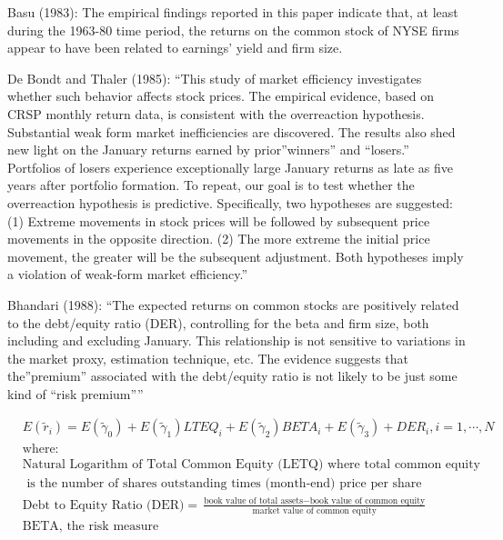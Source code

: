 \documentclass[
  letterpaper,
  DIV=11,
  numbers=noendperiod]{scrreprt}
\begin{document}
Basu (1983): The empirical findings reported in this paper indicate
that, at least during the 1963-80 time period, the returns on the common
stock of NYSE firms appear to have been related to earnings' yield and
firm size.

De Bondt and Thaler (1985): ``This study of market efficiency
investigates whether such behavior affects stock prices. The empirical
evidence, based on CRSP monthly return data, is consistent with the
overreaction hypothesis. Substantial weak form market inefficiencies are
discovered. The results also shed new light on the January returns
earned by prior''winners'' and ``losers.'' Portfolios of losers
experience exceptionally large January returns as late as five years
after portfolio formation. To repeat, our goal is to test whether the
overreaction hypothesis is predictive. Specifically, two hypotheses are
suggested: (1) Extreme movements in stock prices will be followed by
subsequent price movements in the opposite direction. (2) The more
extreme the initial price movement, the greater will be the subsequent
adjustment. Both hypotheses imply a violation of weak-form market
efficiency.''

Bhandari (1988): ``The expected returns on common stocks are positively
related to the debt/equity ratio (DER), controlling for the beta and
firm size, both including and excluding January. This relationship is
not sensitive to variations in the market proxy, estimation technique,
etc. The evidence suggests that the''premium'' associated with the
debt/equity ratio is not likely to be just some kind of ``risk
premium''''

\begin{align}
    & E(\tilde{r}_i) = E(\tilde{\gamma}_0) + E(\tilde{\gamma}_1){LTEQ}_i+E(\tilde{\gamma}_2){BETA}_i+E(\tilde{\gamma}_3)+{DER}_i, i=1,\cdots, N \\
    &\text{where: } \nonumber \\
    &\text{Natural Logarithm of Total Common Equity (LETQ) where total common equity} \nonumber \\ &\text{ is the number of shares outstanding times (month-end) price per share }\nonumber \\
    &\text{Debt to Equity Ratio (DER)}\nonumber = \frac{\text{book value of total assets} -\text{book value of common equity}}{\text{market value of common equity}}\\
    &\text{BETA, the risk measure}\nonumber
\end{align}
\label{Equation:bhandari1988debtEquation1}
\end{document}
